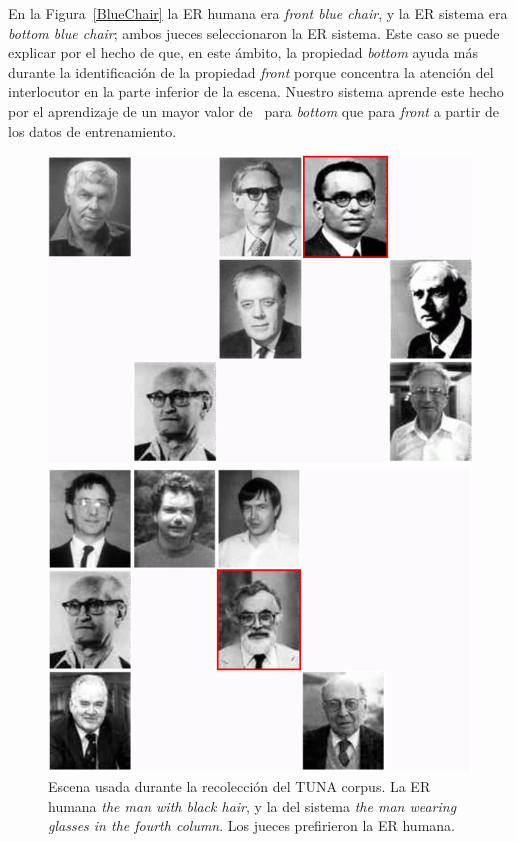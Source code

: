 En la Figura~\ref{BlueChair} la ER humana era {\it front blue chair}, y la ER sistema era {\it bottom blue chair}; ambos jueces seleccionaron la ER sistema. Este caso se puede explicar por el hecho de que, en este \'ambito, la propiedad {\it bottom} ayuda m\'as durante la identificaci\'on de la propiedad {\it front} porque concentra la atenci\'on del interlocutor en la parte inferior de la escena. Nuestro sistema aprende este hecho por el aprendizaje de un mayor valor de \puse\ para {\it bottom} que para {\it front} a partir de los datos de entrenamiento.

\begin{figure}[H]
\begin{minipage}{0.48\linewidth}
\centering
\includegraphics[width=\textwidth]{images/s59t26.jpg}
\caption{Escena usada durante la recolecci\'on del TUNA corpus. La ER humana \emph{the man with black hair}, y la del sistema \emph{the man wearing glasses in the fourth column}. Los jueces prefirieron la ER humana.}
\label{s28t25}
\end{minipage}
\hspace*{.04cm}
\begin{minipage}{0.48\linewidth}
\centering
\includegraphics[width=\textwidth]{images/s315t21.jpg}

\end{minipage}
\end{figure}
